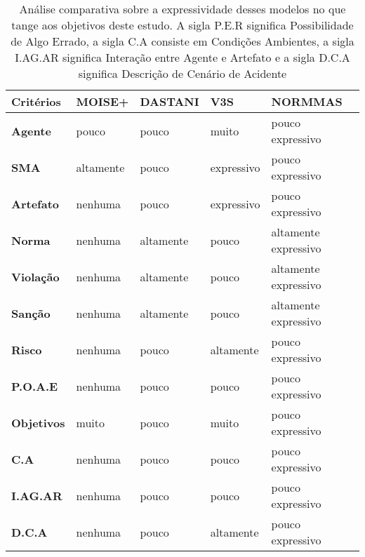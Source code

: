 \begin{table}[H]
    \centering
    \begin{tabular}{|l|l|l|l|l|}
        \hline
        \textbf{Critérios} & \textbf{MOISE+}        & \textbf{DASTANI}     & \textbf{V3S}         & \textbf{NORMMAS}          \\ \hline
        \textbf{Agente}    & pouco                  & pouco                & muito                & pouco expressivo          \\ \hline
        \textbf{SMA}       & altamente              & pouco                & expressivo           & pouco expressivo          \\ \hline
        \textbf{Artefato}  & nenhuma                & pouco                & expressivo           & pouco expressivo          \\ \hline
        \textbf{Norma}     & nenhuma                & altamente            & pouco                & altamente expressivo      \\ \hline
        \textbf{Violação}  & nenhuma                & altamente            & pouco                & altamente expressivo      \\ \hline
        \textbf{Sanção}    & nenhuma                & altamente            & pouco                & altamente expressivo      \\ \hline
        \textbf{Risco}     & nenhuma                & pouco                & altamente            & pouco expressivo          \\ \hline
        \textbf{P.O.A.E}   & nenhuma                & pouco                & pouco                & pouco expressivo          \\ \hline
        \textbf{Objetivos} & muito                  & pouco                & muito                & pouco expressivo          \\ \hline
        \textbf{C.A}       & nenhuma                & pouco                & pouco                & pouco expressivo          \\ \hline
        \textbf{I.AG.AR}   & nenhuma                & pouco                & pouco                & pouco expressivo          \\ \hline
        \textbf{D.C.A}     & nenhuma                & pouco                & altamente            & pouco expressivo          \\ \hline
    \end{tabular}
    \caption{Análise comparativa sobre a expressividade desses modelos no que tange aos objetivos deste estudo. A sigla P.E.R significa Possibilidade de Algo Errado, a sigla C.A consiste em 
    Condições Ambientes, a sigla I.AG.AR significa Interação entre Agente e Artefato e a sigla D.C.A significa Descrição de Cenário de Acidente}
    \label{comparemodel}
\end{table}

